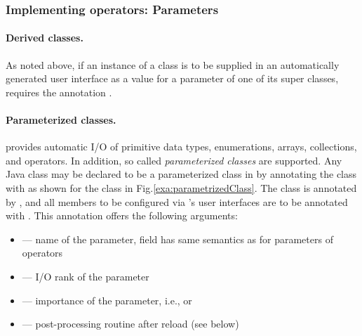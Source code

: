 \subsubsection{Implementing operators: Parameters}
\label{subsubsec:datatypes}

\paragraph{Derived classes.}
As noted above, 
if an instance of a class is to be supplied in an automatically
generated user interface as a value for a parameter of one of its super classes,
\alida requires the annotation .

\paragraph{Parameterized classes.}
\alida provides automatic I/O of primitive data types, enumerations, arrays, collections,
and operators.
In addition, so called \textit{parameterized classes} are supported.
Any Java class may be declared to be a parameterized class in \alida
by annotating the class with  as shown for the
class  in Fig.\ref{exa:parametrizedClass}.
The class is annotated by ,
and all members to be configured via \alida's user interfaces are
to be annotated with . This annotation offers the
following arguments:
\begin{itemize}
  \item {} --- name of the parameter, field has same
	semantics as for parameters of operators
  \item {} --- I/O rank of the parameter	 
  \item {} ---
	importance of the parameter, i.e.,  or 	 
  \item {} --- post-processing routine after reload (see
  below)
\end{itemize}

